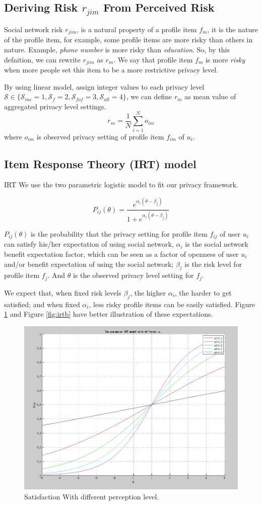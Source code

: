 \documentclass[a4paper]{article}
\begin{document}
\subsection{Deriving Risk $r_{jim}$ From Perceived Risk}
Social network risk $r_{jim}$, is a natural property of a profile item
$f_{m}$, it is the nature of the profile item, for example, some
profile items are more risky than others in nature. Example,
\emph{phone number} is more risky than \emph{education}. So, by this
defnition, we can rewrite $r_{jim}$ as $r_m$. We say that profile item
$f_m$ is more \emph{risky} when more people set this item to be a more
restrictive privacy level.

By using linear model, assign integer values to each privacy level
$\mathcal{S}\in \{\mathcal{S}_{me}=1, \mathcal{S}_{f}=2,
\mathcal{S}_{fof}=3, \mathcal{S}_{all}=4\}$, we can define $r_m$ as
mean value of aggregated privacy level settings.
\[ r_m = \frac{1}{N} \sum_{i=1}^No_{im} \]
where $o_{im}$ is observed privacy setting of profile item $f_{im}$
of $u_i$.

\subsection{Item Response Theory (IRT) model}
IRT
We use the two parametric logistic model to fit our privacy framework.

\[ P_{ij}(\theta) = \frac{e^{\alpha_i(\theta - \beta_j)}}
{1+e^{\alpha_i(\theta - \beta_j)}} \]

$P_{ij}(\theta)$ is the probability that the privacy setting for
profile item $f_{ij}$ of user $u_i$
can satisfy his/her expectation of using social network,
$\alpha_i$ is the social network benefit expectation
factor, which can be seen as a factor of openness of user $u_i$ and/or
benefit expectation of using the social network; $\beta_j$ is the risk
level for profile item $f_j$. And $\theta$ is the observed privacy
level setting for $f_j$.

We expect that, when fixed risk levels $\beta_j$, the higher
$\alpha_i$, the harder to get satisfied; and when fixed $\alpha_i$,
less risky profile items can be easily satisfied. Figure \ref{fig:irta}
and Figure \ref{fig:irtb} have better illustration of these
expectations.
\begin{figure}[H]
  \centering
  \includegraphics[width=.7\textwidth]{IRT-a.jpg}
  \caption{Satisfaction With different perception level.}
  \label{fig:irta}
\end{figure}
\end{document}
